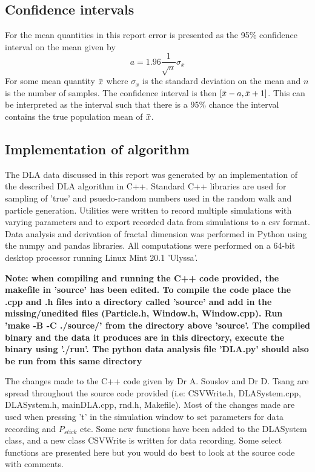\documentclass[10pt, twocolumn]{article} %
\newcommand{\overbar}[1]{\mkern 1.5mu\overline{\mkern-1.5mu#1\mkern-1.5mu}\mkern 1.5mu}
\begin{document}
\subsection*{Confidence intervals}
  For the mean quantities in this report error is presented as the 95\% confidence interval on the mean given by
  \begin{equation}
    a = 1.96\frac{1}{\sqrt{n}}\sigma_x
  \end{equation}
  For some mean quantity $\overbar{x}$ where $\sigma_x$ is the standard deviation on the mean and $n$ is the number of samples. The confidence interval is then $[\overbar{x}-a, \overbar{x}+1]$. This can be interpreted as the interval such that there is a 95\% chance the interval contains the true population mean of $\overbar{x}$.

\subsection*{Implementation of algorithm}
  The DLA data discussed in this report was generated by an implementation of the described DLA algorithm in C++. Standard C++ libraries are used for sampling of 'true' and psuedo-random numbers used in the random walk and particle generation. Utilities were written to record multiple simulations with varying parameters and to export recorded data from simulations to a csv format. Data analysis and derivation of fractal dimension was performed in Python using the numpy and pandas libraries. All computations were performed on a 64-bit desktop processor running Linux Mint 20.1 'Ulyssa'.

  \textbf{Note: when compiling and running the C++ code provided, the makefile in 'source' has been edited. To compile the code place the .cpp and .h files into a directory called 'source' and add in the missing/unedited files (Particle.h, Window.h, Window.cpp). Run 'make -B -C ./source/' from the directory above 'source'. The compiled binary and the data it produces are in this directory, execute the binary using './run'. The python data analysis file 'DLA.py' should also be run from this same directory}

  The changes made to the C++ code given by Dr A. Souslov and Dr D. Tsang are spread throughout the source code provided (i.e: CSVWrite.h, DLASystem.cpp, DLASystem.h, mainDLA.cpp, rnd.h, Makefile). Most of the changes made are used when pressing 't' in the simulation window to set parameters for data recording and $P_{stick}$ etc. Some new functions have been added to the DLASystem class, and a new class CSVWrite is written for data recording. Some select functions are presented here but you would do best to look at the source code with comments.
\end{document}

